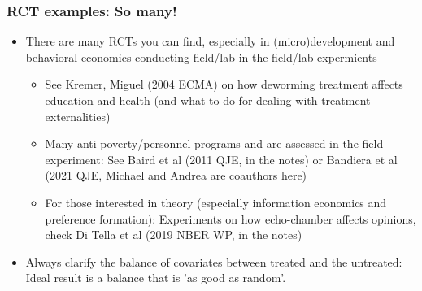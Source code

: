 \documentclass[aspectratio=169]{beamer}
\begin{document}
\begin{frame}
\frametitle{RCT examples: So many!}
\begin{itemize}
\item There are many RCTs you can find, especially in (micro)development and behavioral economics conducting field/lab-in-the-field/lab expermients
\begin{itemize}
\item See Kremer, Miguel (2004 ECMA) on how deworming treatment affects education and health (and what to do for dealing with treatment externalities)
\item Many anti-poverty/personnel programs and are assessed in the field experiment: See Baird et al (2011 QJE, in the notes) or Bandiera et al (2021 QJE, Michael and Andrea are coauthors here)
\item For those interested in theory (especially information economics and preference formation): Experiments on how echo-chamber affects opinions, check Di Tella et al (2019 NBER WP, in the notes)
\end{itemize}
\item Always clarify the balance of covariates between treated and the untreated: Ideal result is a balance that is 'as good as random'. 
\end{itemize}
\end{frame}
\end{document}
